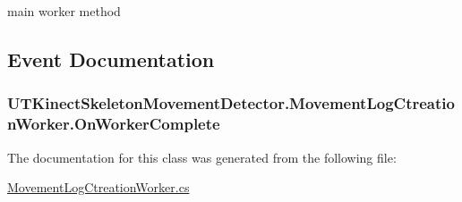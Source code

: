main worker method 



\subsection{Event Documentation}
\hypertarget{class_u_t_kinect_skeleton_movement_detector_1_1_movement_log_ctreation_worker_a9602a7bd07fa4db7c977303e6b25e4ec}{
\subsubsection[{On\-Worker\-Complete}]{ U\-T\-Kinect\-Skeleton\-Movement\-Detector.\-Movement\-Log\-Ctreation\-Worker.\-On\-Worker\-Complete}}\label{class_u_t_kinect_skeleton_movement_detector_1_1_movement_log_ctreation_worker_a9602a7bd07fa4db7c977303e6b25e4ec}


The documentation for this class was generated from the following file\-:\begin{DoxyCompactItemize}
\item 
\hyperlink{_movement_log_ctreation_worker_8cs}{Movement\-Log\-Ctreation\-Worker.\-cs}\end{DoxyCompactItemize}
